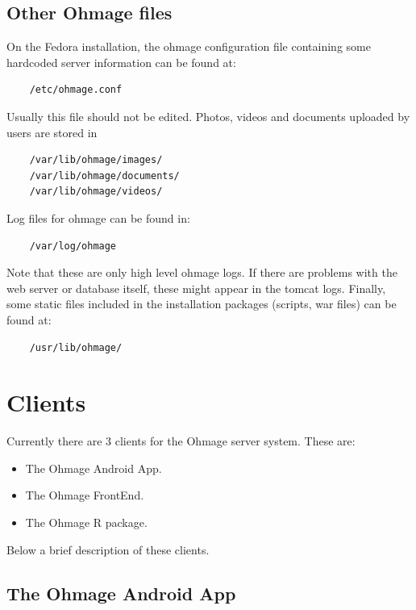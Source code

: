 \documentclass{scrartcl}
\begin{document}
\subsection{Other Ohmage files}

On the Fedora installation, the ohmage configuration file containing some
hardcoded server information can be found at:

\begin{verbatim}
    /etc/ohmage.conf
\end{verbatim}

\noindent Usually this file should not be edited. Photos, videos and documents uploaded by users are stored in

\begin{verbatim}
    /var/lib/ohmage/images/
    /var/lib/ohmage/documents/
    /var/lib/ohmage/videos/
\end{verbatim}
Log files for ohmage can be found in:

\begin{verbatim}
    /var/log/ohmage
\end{verbatim}

\noindent Note that these are only high level ohmage logs. If there are problems
with the web server or database itself, these might appear in the tomcat logs. 
Finally, some static files included in the installation packages (scripts,
war files) can be found at:

\begin{verbatim}
    /usr/lib/ohmage/
\end{verbatim}

\section{Clients}

Currently there are 3 clients for the Ohmage server system. These are:

\begin{itemize}
  \item The Ohmage Android App.
  \item The Ohmage FrontEnd.
  \item The Ohmage R package.
\end{itemize}
Below a brief description of these clients.

\subsection{The Ohmage Android App}
\end{document}
